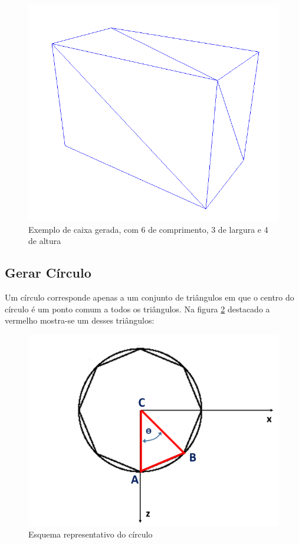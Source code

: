 \begin{figure}[<+htpb+>]
	\centering
	\includegraphics[scale=0.5]{imagens/p3_caixa_6_3_4.png}
	\caption{Exemplo de caixa gerada, com 6 de comprimento, 3 de largura e 4 de altura}
	\label{p1:fig:p3_caixa_6_3_4}
\end{figure}

\newpage
\subsection{Gerar Círculo}
\label{p3:circulo}

Um círculo corresponde apenas a um conjunto de triângulos em que o centro do círculo é um ponto comum a todos os triângulos. Na figura \ref{p1:fig:p3_circulo} destacado a vermelho mostra-se um desses triângulos:

\begin{figure}[<+htpb+>]
	\centering
	\includegraphics[scale=0.5]{imagens/p3_circulo.png}
	\caption{Esquema representativo do círculo}
	\label{p1:fig:p3_circulo}
\end{figure}

